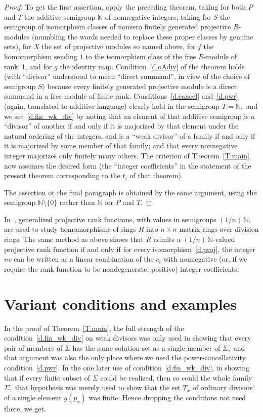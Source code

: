 \documentclass{amsart}
\numberwithin{equation}{section}
\numberwithin{theorem}{section}
\newcommand{\N}{\mathbb{N}}
\newcommand{\2}{\mathbf{2}}
\begin{document}
\begin{proof}
To get the first assertion, apply the preceding theorem,
taking for both $P$ and $T$ the additive semigroup $\N$ of
nonnegative integers, taking for $S$ the
semigroup of isomorphism classes of nonzero finitely generated
projective $\!R\!$-modules (mumbling the words needed to replace
these proper classes by genuine sets),
for $X$ the set of projective
modules so named above, for $f$ the homomorphism
sending $1$ to the isomorphism class of the
free $\!R\!$-module of rank\ 1, and for $g$ the identity map.
Condition~\eqref{d.oAdiv} of the theorem holds (with ``divisor''
understood to mean ``direct summand'', in view of the
choice of semigroup $S)$ because every finitely generated
projective module is a direct summand in a free module of
finite rank.
Conditions~\eqref{d.cancel} and~\eqref{d.pwr}
(again, translated to additive language) clearly hold
in the semigroup $T=\N,$ and we
see~\eqref{d.fin_wk_div} by noting that an element
of that additive semigroup is a ``divisor'' of another if and only
if it is majorized by that element under the natural ordering
of the integers, and is a ``weak divisor'' of a family if and only
if it is majorized by some member of that family; and
that every nonnegative integer majorizes only finitely many others.
The criterion of Theorem~\ref{T.main} now assumes the desired form
(the ``integer coefficients'' in the statement of the present theorem
corresponding to the $t_i$ of that theorem).

The assertion ot the final paragraph
is obtained by the same argument, using the
semigroup $\N\setminus\{0\}$ rather than $\N$ for $P$ and $T.$
\end{proof}

In~\cite{AS}, generalized projective rank functions, with values
in semigroups $(1/n)\,\N,$ are used to study homomorphisms of
rings $R$ into $n\times n$ matrix rings over division rings.
The same method as above shows that $R$ admits a
$\!(1/n)\,\N\!$-valued projective rank
function if and only if for every isomorphism~\eqref{d.proj}, the
integer $nc$ can be written as a linear
combination of the $c_i$ with nonnegative (or, if we require
the rank function to be nondegenerate, positive) integer coefficients.

\section{Variant conditions and examples}\label{S.var+eg}

In the proof of Theorem~\ref{T.main}, the full strength of
the condition~\eqref{d.fin_wk_div} on weak divisors
was only used in showing that every pair of members of $\Sigma$ has
the same solution-set as a
single member of $\Sigma;$ and that argument was also the only
place where we used the power-cancellativity condition~\eqref{d.pwr}.
In the one later use of condition~\eqref{d.fin_wk_div},
in showing that if every finite subset of $\Sigma$ could
be realized, then so could the whole family $\Sigma,$ that hypothesis
was merely used to show that the set $T_x$ of ordinary divisors
of a single element $g(p_x)$ was finite.
Hence dropping the conditions not used there, we get.
\end{document}

